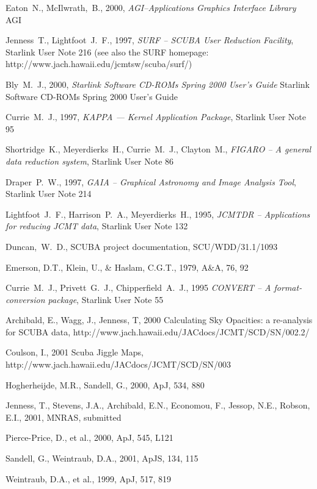 \documentclass[twoside,11pt]{article}
\newcommand{\htmladdnormallink}[2]{#1}
\newcommand{\xref}[3]{#1}
\renewcommand{\_}{\texttt{\symbol{95}}}
\begin{document}
\begin{thebibliography}{}

 Eaton~N., McIlwrath,~B., 2000, \textit{AGI--Applications Graphics 
Interface Library}
\xref{AGI}{sun48}{}

Jenness~T., Lightfoot~J.~F., 1997, \textit{SURF -- SCUBA User 
Reduction Facility},
\xref{Starlink User Note 216}{sun216}{} (see also the SURF homepage:
\htmladdnormallink{http://www.jach.hawaii.edu/jcmt\_sw/scuba/surf/}{http://www.jach.hawaii.edu/jcmt_sw/scuba/surf/})


Bly~M.~J., 2000, {\it Starlink  Software CD-ROMs Spring 2000 User's 
Guide}
\xref{Starlink  Software CD-ROMs Spring 2000 User's Guide}{sun212}{}


Currie~M.~J., 1997, {\it KAPPA --- Kernel Application Package},
\xref{Starlink User Note 95}{sun95}{}

Shortridge~K., Meyerdierks~H., Currie~M.~J., Clayton~M., 
{\it FIGARO -- A general data reduction system}, 
\xref{Starlink User Note 86}{sun86}{}

Draper~P.~W., 1997, {\it GAIA -- Graphical Astronomy and Image 
Analysis Tool},
\xref{Starlink User Note 214}{sun214}{}


Lightfoot~J.~F., Harrison~P.~A., Meyerdierks~H., 1995, \textit{JCMTDR 
-- Applications for reducing JCMT data}, \xref{Starlink User Note 
132}{sun132}{}


Duncan,~W.~D., SCUBA project documentation, SCU/WDD/31.1/1093

Emerson, D.T., Klein, U., \& Haslam, C.G.T., 1979, A\&A, 76, 92

Currie~M.~J., Privett~G.~J., Chipperfield~A.~J., 1995 {\it CONVERT --
A format-conversion package}, \xref{Starlink User Note 55}{sun55}{}

Archibald, E., Wagg, J., Jenness, T, 2000 {Calculating Sky Opacities: 
a
re-analysis for SCUBA data}, 
{\htmladdnormallink{http://www.jach.hawaii.edu/JACdocs/JCMT/SCD/SN/002.2/}{http://www.jach.hawaii.edu/JACdocs/JCMT/SCD/SN/002.2/ 

} }

Coulson, I., 2001 { Scuba Jiggle Maps}, 
{\htmladdnormallink{http://www.jach.hawaii.edu/JACdocs/JCMT/SCD/SN/003}{http://www.jach.hawaii.edu/JACdocs/JCMT/SCD/SN/003}}

Hogherheijde, M.R., Sandell, G., 2000, ApJ, 534, 880

Jenness, T., Stevens, J.A., Archibald, E.N., Economou, F., Jessop, 
N.E., Robson, E.I., 2001, MNRAS, submitted

Pierce-Price, D., et al., 2000, ApJ, 545, L121

Sandell, G., Weintraub, D.A., 2001, ApJS, 134, 115

Weintraub, D.A., et al., 1999, ApJ, 517, 819


\end{thebibliography}
 
\end{document}
